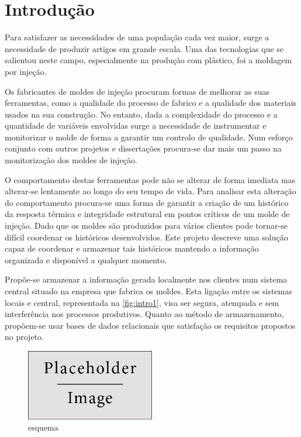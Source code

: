 \documentclass[11pt,twoside,a4paper]{report}
\begin{document}
\chapter{Introdução}
\label{chap:intro}
Para satisfazer as necessidades de uma população cada vez maior, surge a necessidade de produzir artigos em grande escala. Uma das tecnologias que se salientou neste campo, especialmente na produção com plástico, foi a moldagem por injeção.\par
Os fabricantes de moldes de injeção procuram formas de melhorar as suas ferramentas, como a qualidade do processo de fabrico e a qualidade dos materiais usados na sua construção. No entanto, dada a complexidade do processo e a quantidade de variáveis envolvidas surge a necessidade de instrumentar e monitorizar o molde de forma a garantir um controlo de qualidade. Num esforço conjunto com outros projetos e dissertações
procura-se dar mais um passo na monitorização dos moldes de injeção.\par
O comportamento destas ferramentas pode não se alterar de forma imediata mas alterar-se lentamente ao longo do seu tempo de vida. Para analisar esta alteração do comportamento procura-se uma forma de garantir a criação de um histórico da resposta térmica e integridade estrutural em pontos críticos de um molde de injeção. Dado que os moldes são produzidos para vários clientes pode tornar-se difícil coordenar os históricos desenvolvidos. Este projeto descreve uma solução capaz de coordenar e armazenar tais históricos mantendo a informação organizada e disponível a qualquer momento.\par 
Propõe-se armazenar a informação gerada localmente nos clientes num sistema central situado na empresa que fabrica os moldes. Esta ligação entre os sistemas locais e central, representada na \autoref{fig:intro1}, visa ser segura, atempada e sem interferência nos processos produtivos. Quanto ao método de armazenamento, propõem-se usar bases de dados relacionais que satisfação os requisitos propostos no projeto.
\begin{figure}[H]
	\begin{center}
		\includegraphics[width=0.5\textwidth]{placeholder} %
		\caption{esquema}
		\label{fig:intro1}
	\end{center}
\end{figure}
\end{document}
